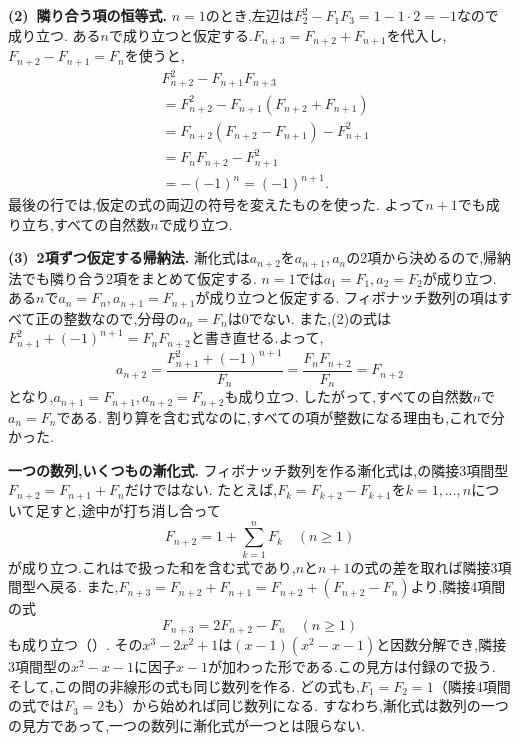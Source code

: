 \begin{enumerate}[label=\textbf{問\arabic*.},leftmargin=3.8em,format=\bookitemlink{practice-bridge}{solution}{problem}]
    \smallskip
    \textbf{(2)~隣り合う項の恒等式.}
    $n=1$のとき,左辺は$F_2^2-F_1F_3=1-1\cdot2=-1$なので成り立つ.
    ある$n$で成り立つと仮定する.$F_{n+3}=F_{n+2}+F_{n+1}$を代入し,$F_{n+2}-F_{n+1}=F_n$を使うと,
    \begin{align*}
      &F_{n+2}^2-F_{n+1}F_{n+3}\\
      &=F_{n+2}^2-F_{n+1}(F_{n+2}+F_{n+1})\\
      &=F_{n+2}(F_{n+2}-F_{n+1})-F_{n+1}^2\\
      &=F_nF_{n+2}-F_{n+1}^2\\
      &=-(-1)^n=(-1)^{n+1}.
    \end{align*}
    最後の行では,仮定の式の両辺の符号を変えたものを使った.
    よって$n+1$でも成り立ち,すべての自然数$n$で成り立つ.

    \smallskip
    \textbf{(3)~2項ずつ仮定する帰納法.}
    漸化式は$a_{n+2}$を$a_{n+1},a_n$の2項から決めるので,帰納法でも隣り合う2項をまとめて仮定する.
    $n=1$では$a_1=F_1,a_2=F_2$が成り立つ.
    ある$n$で$a_n=F_n,a_{n+1}=F_{n+1}$が成り立つと仮定する.
    フィボナッチ数列の項はすべて正の整数なので,分母の$a_n=F_n$は$0$でない.
    また,(2)の式は$F_{n+1}^2+(-1)^{n+1}=F_nF_{n+2}$と書き直せる.よって,
    \[
      a_{n+2}=\frac{F_{n+1}^2+(-1)^{n+1}}{F_n}
      =\frac{F_nF_{n+2}}{F_n}=F_{n+2}
    \]
    となり,$a_{n+1}=F_{n+1},a_{n+2}=F_{n+2}$も成り立つ.
    したがって,すべての自然数$n$で$a_n=F_n$である.
    割り算を含む式なのに,すべての項が整数になる理由も,これで分かった.

    \smallskip
    \textbf{一つの数列,いくつもの漸化式.}
    フィボナッチ数列を作る漸化式は,の隣接3項間型$F_{n+2}=F_{n+1}+F_n$だけではない.
    たとえば,$F_k=F_{k+2}-F_{k+1}$を$k=1,\ldots,n$について足すと,途中が打ち消し合って
    \[
      F_{n+2}=1+\sum_{k=1}^{n}F_k
      \quad(n\ge1)
    \]
    が成り立つ.これはで扱った和を含む式であり,$n$と$n+1$の式の差を取れば隣接3項間型へ戻る.
    また,$F_{n+3}=F_{n+2}+F_{n+1}=F_{n+2}+(F_{n+2}-F_n)$より,隣接4項間の式
    \[
      F_{n+3}=2F_{n+2}-F_n
      \quad(n\ge1)
    \]
    も成り立つ（）.
    その$x^3-2x^2+1$は$(x-1)(x^2-x-1)$と因数分解でき,隣接3項間型の$x^2-x-1$に因子$x-1$が加わった形である.この見方は付録ので扱う.
    そして,この問の非線形の式も同じ数列を作る.
    どの式も,$F_1=F_2=1$（隣接4項間の式では$F_3=2$も）から始めれば同じ数列になる.
    すなわち,漸化式は数列の一つの見方であって,一つの数列に漸化式が一つとは限らない.
\end{enumerate}

